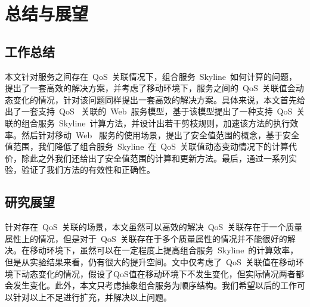 \chapter{总结与展望}

\section{工作总结}

本文针对服务之间存在~QoS~关联情况下，组合服务~Skyline~如何计算的问题，提出了一套高效的解决方案，并考虑了移动环境下，服务之间的~QoS~关联值会动态变化的情况，针对该问题同样提出一套高效的解决方案。具体来说，本文首先给出了一套支持~QoS~ 关联的~Web~服务模型，基于该模型提出了一种支持~QoS~关联的组合服务~Skyline~计算方法，并设计出若干剪枝规则，加速该方法的执行效率。然后针对移动~Web~ 服务的使用场景，提出了安全值范围的概念，基于安全值范围，我们降低了组合服务~Skyline~在~QoS~关联值动态变动情况下的计算代价，除此之外我们还给出了安全值范围的计算和更新方法。最后，通过一系列实验，验证了我们方法的有效性和正确性。


\section{研究展望}

针对存在~QoS~关联的场景，本文虽然可以高效的解决~QoS~关联存在于一个质量属性上的情况，但是对于~QoS~关联存在于多个质量属性的情况并不能很好的解决。在移动环境下，虽然可以在一定程度上提高组合服务~Skyline~的计算效率，但是从实验结果来看，仍有很大的提升空间。文中仅考虑了~QoS~关联值在移动环境下动态变化的情况，假设了QoS值在移动环境下不发生变化，但实际情况两者都会发生变化。此外，本文只考虑抽象组合服务为顺序结构。我们希望以后的工作可以针对以上不足进行扩充，并解决以上问题。
